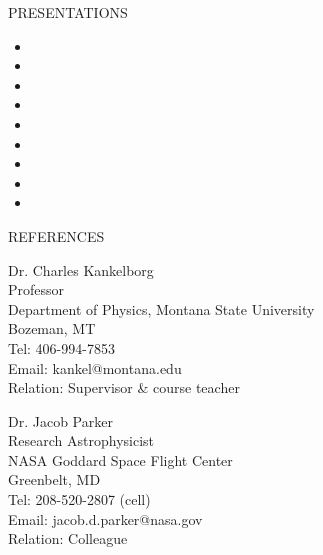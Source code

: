 \documentclass{resume} %
\begin{document}
\begin{rSection}{PRESENTATIONS}
\small
\begin{itemize}[leftmargin=*]
	\item {}
	\item {}
	\item {}
	\item {}
	\item {}
	\item {}
	\item {}
	\item {}
	\item {}
\end{itemize}


%
%

\end{rSection}



\begin{rSection}{REFERENCES}
\begin{minipage}[h]{0.5\textwidth}
Dr. Charles Kankelborg\\
Professor\\
Department of Physics, Montana State University\\Bozeman, MT\\
Tel: 406-994-7853\\
Email: kankel@montana.edu\\
Relation: Supervisor \& course teacher 
\end{minipage}
\hfill
\begin{minipage}[h]{0.5\textwidth}
Dr. Jacob Parker\\
Research Astrophysicist\\
NASA Goddard Space Flight Center\\ Greenbelt, MD\\
Tel: 208-520-2807 (cell)\\
Email: jacob.d.parker@nasa.gov\\
Relation: Colleague
\end{minipage}
\hfill
\end{rSection}
\end{document}
